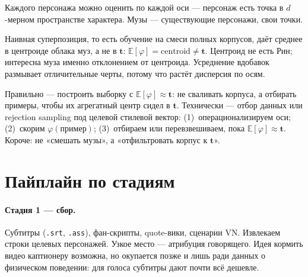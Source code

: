 Каждого персонажа можно оценить по каждой оси — персонаж есть точка в $d$-мерном
пространстве характера. Музы — существующие персонажи, свои точки.

Наивная суперпозиция, то есть обучение на смеси полных корпусов, даёт среднее в
центроиде облака муз, а не в $\mathbf{t}$: $\mathbb{E}[\varphi]=\text{centroid}\ne\mathbf{t}$.
Центроид не есть Рин; интересна муза именно отклонением от центроида. Усреднение
вдобавок размывает отличительные черты, потому что растёт дисперсия по осям.

Правильно — построить выборку с $\mathbb{E}[\varphi]\approx\mathbf{t}$: не сваливать
корпуса, а отбирать примеры, чтобы их агрегатный центр сидел в $\mathbf{t}$.
Технически — отбор данных или rejection sampling под целевой стилевой вектор:
(1)~операционализируем оси; (2)~скорим $\varphi(\text{пример})$;
(3)~отбираем или перевзвешиваем, пока $\mathbb{E}[\varphi]\approx\mathbf{t}$.
Короче: не «смешать музы», а «отфильтровать корпус к $\mathbf{t}$».

\section{Пайплайн по стадиям}

\begin{center}
\end{center}

\paragraph{Стадия 1 — сбор.}
Субтитры (\texttt{.srt}, \texttt{.ass}), фан-скрипты, quote-вики, сценарии VN.
Извлекаем строки целевых персонажей. Узкое место — атрибуция говорящего. Идея
кормить видео каптионеру возможна, но окупается позже и лишь ради данных о
физическом поведении: для голоса субтитры дают почти всё дешевле.

